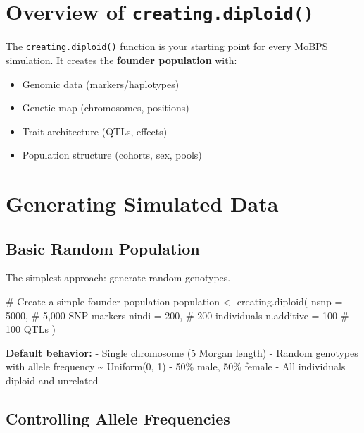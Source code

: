 \documentclass[
  letterpaper,
]{book}
\newenvironment{Shaded}{\begin{snugshade}}{\end{snugshade}}
\newcommand{\AttributeTok}[1]{\textcolor[rgb]{0.40,0.45,0.13}{#1}}
\newcommand{\CommentTok}[1]{\textcolor[rgb]{0.37,0.37,0.37}{#1}}
\newcommand{\DecValTok}[1]{\textcolor[rgb]{0.68,0.00,0.00}{#1}}
\newcommand{\FunctionTok}[1]{\textcolor[rgb]{0.28,0.35,0.67}{#1}}
\newcommand{\NormalTok}[1]{\textcolor[rgb]{0.00,0.23,0.31}{#1}}
\newcommand{\OtherTok}[1]{\textcolor[rgb]{0.00,0.23,0.31}{#1}}
\providecommand{\tightlist}{%
  \setlength{\itemsep}{0pt}\setlength{\parskip}{0pt}}
\begin{document}
\section{\texorpdfstring{Overview of
\texttt{creating.diploid()}}{Overview of creating.diploid()}}\label{overview-of-creating.diploid}

The \texttt{creating.diploid()} function is your starting point for
every MoBPS simulation. It creates the \textbf{founder population} with:

\begin{itemize}
\tightlist
\item
  Genomic data (markers/haplotypes)
\item
  Genetic map (chromosomes, positions)
\item
  Trait architecture (QTLs, effects)
\item
  Population structure (cohorts, sex, pools)
\end{itemize}

\section{Generating Simulated Data}\label{sec-simulated-data}

\subsection{Basic Random Population}\label{basic-random-population}

The simplest approach: generate random genotypes.

\begin{Shaded}
\begin{Highlighting}[]
\CommentTok{\# Create a simple founder population}
\NormalTok{population }\OtherTok{\textless{}{-}} \FunctionTok{creating.diploid}\NormalTok{(}
  \AttributeTok{nsnp =} \DecValTok{5000}\NormalTok{,          }\CommentTok{\# 5,000 SNP markers}
  \AttributeTok{nindi =} \DecValTok{200}\NormalTok{,          }\CommentTok{\# 200 individuals}
  \AttributeTok{n.additive =} \DecValTok{100}      \CommentTok{\# 100 QTLs}
\NormalTok{)}
\end{Highlighting}
\end{Shaded}

\textbf{Default behavior:} - Single chromosome (5 Morgan length) -
Random genotypes with allele frequency \textasciitilde{} Uniform(0, 1) -
50\% male, 50\% female - All individuals diploid and unrelated

\subsection{Controlling Allele
Frequencies}\label{controlling-allele-frequencies}
\end{document}
